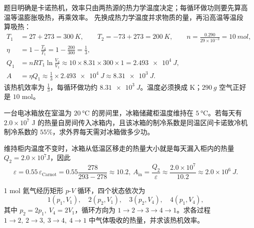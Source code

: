 \documentclass[lang=cn,11pt]{elegantbook}
\begin{document}
\begin{solution}
题目明确是卡诺热机，效率只由两热源的热力学温度决定；每循环做功则要先算高温等温膨胀吸热，再乘效率。
先换成热力学温度并求物质的量，再沿高温等温段算吸热：
\[
\begin{aligned}
T_1&=27+273=\SI{300}{K},\qquad
T_2=-73+273=\SI{200}{K},\qquad
n=\frac{0.290}{29\times10^{-3}}=10\ \si{mol},\\
\eta&=1-\frac{T_2}{T_1}
=1-\frac{200}{300}
=\frac13,\\
Q_1&=nRT_1\ln\frac{V_2}{V_1}
\approx 10\times 8.31\times300\times1
=\SI{2.493e4}{J},\\
A&=\eta Q_1
\approx \frac13\times \SI{2.493e4}{J}
\approx \SI{8.31e3}{J}.
\end{aligned}
\]
该热机效率为 \(\frac13\)，每循环做功约 \(\SI{8.31e3}{J}\)。温度必须换成 K；\(\SI{290}{g}\) 空气正好是 \(10\) mol。
\end{solution}

\begin{exercise}[电冰箱的输入功怎样由致冷系数反推]
一台电冰箱放在室温为 \(\SI{20}{\celsius}\) 的房间里，冰箱储藏柜温度维持在 \(\SI{5}{\celsius}\)。若每天有 \(2.0\times10^7\) J 的热量自房间传入冰箱内，且该冰箱的制冷系数是同温区间卡诺致冷机制冷系数的 \(55\%\)，求外界每天需对冰箱做多少功。
\end{exercise}

\begin{solution}
维持柜内温度不变时，冰箱从低温区移走的热量大小就是每天漏入柜内的热量$Q_2=2.0\times10^7$J，因此
 \[\varepsilon=0.55\,\varepsilon_{\text{Carnot}}=0.55\frac{278}{293-278}\approx 10.2,~A_{\text{in}}=\frac{Q_2}{\varepsilon} \approx \frac{2.0\times10^7}{10.2} \approx 2.0\times10^6\ \si{J}.\]
\end{solution}

\begin{exercise}
1 mol 氦气经历矩形 \(p\)-\(V\) 循环，四个状态依次为
\[
1(p_1,V_1),\quad 2(p_2,V_1),\quad 3(p_2,V_4),\quad 4(p_1,V_4),
\]
其中 \(p_2=2p_1,\ V_4=2V_1\)，循环方向为 \(1\to2\to3\to4\to1\)。求各过程 \(1\to2,\ 2\to3,\ 3\to4,\ 4\to1\) 中气体吸收的热量，并求该热机效率。
\end{exercise}
\end{document}
